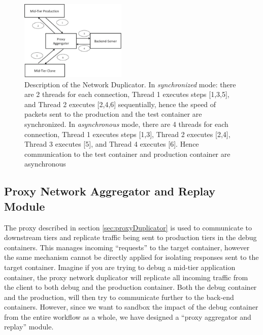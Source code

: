 

\begin{figure}[t]
  \begin{center}
    \includegraphics[width=0.45\textwidth]{figs/aggregator.eps}
    \caption{Description of the Network Duplicator. In \textit{synchronized} mode: there are 2 threads for each connection, Thread 1 executes steps [1,3,5], and Thread 2 executes [2,4,6] sequentially, hence the speed of packets sent to the production and the test container are synchronized. In \textit{asynchronous} mode, there are 4 threads for each connection, Thread 1 executes steps [1,3], Thread 2 executes [2,4], Thread 3 executes [5], and Thread 4 executes [6]. Hence communication to the test container and production container are asynchronous}
    \label{fig:duplicator}
  \end{center}
\end{figure}

\subsection{Proxy Network Aggregator and Replay Module}
\label{sec:proxyAggregator}

The proxy described in section \ref{sec:proxyDuplicator} is used to communicate to downstream tiers and replicate traffic being sent to production tiers in the debug containers.
This manages incoming ``requests'' to the target container, however the same mechanism cannot be directly applied for isolating responses sent to the target container. 
Imagine if you are trying to debug a mid-tier application container, the proxy network duplicator will replicate all incoming traffic from the client to both debug and the production container. 
Both the debug container and the production, will then try to communicate further to the back-end containers.
However, since we want to sandbox the impact of the debug container from the entire workflow as a whole, we have designed a ``proxy aggregator and replay'' module.

